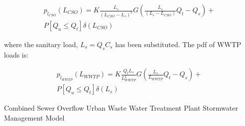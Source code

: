 \documentclass[draft,linenumbers]{agujournal2018}
\begin{document}
\begin{linenomath*}
\begin{eqnarray}\nonumber
p_{l_{CSO}} \left(L_{CSO} \right) = K  \frac{L_s}{\left(L_{CSO}-L_s \right)^2}    G\left(\frac{L_s}{\left(L_s - L_{CSO}\right)}  Q_t - Q_s \right)  + \\
P\left[Q_u \le Q_t \right]\delta\left(L_{CSO}\right)
\label{eq:a11}
\end{eqnarray}
\end{linenomath*}
where the sanitary load, $L_s = Q_s  C_s$ has been substituted. The pdf of WWTP loads is:
\begin{linenomath*}
\begin{eqnarray}
p_{l_{WWTP}} \left(L_{WWTP} \right) = K  \frac{Q_t L_s}{L_{WWTP}^2}    G\left(\frac{L_s}{L_{WWTP}}  Q_t - Q_s \right)  + \\
P\left[Q_u \le Q_t \right]\delta\left(L_s\right)
\label{eq:a12}
\end{eqnarray}
\end{linenomath*} 


%
%

%
   \begin{acronyms}
    Combined Sewer Overf\/low
    Urban Waste Water Treatment Plant
    Stormwater Management Model
   \end{acronyms}

%




%
%
%
%
%
%
%
%
\end{document}
